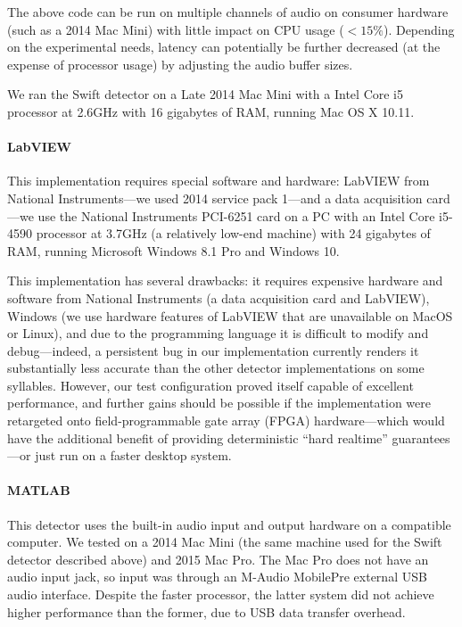 \documentclass[10pt,letterpaper]{article}
\renewcommand{\subsubsection}[1]{\paragraph{#1}}
\begin{document}
The above code can be run on multiple channels of audio on consumer
hardware (such as a 2014 Mac Mini) with little impact on CPU usage
($<15\%$). Depending on the experimental needs, latency can potentially
be further decreased (at the expense of processor usage) by adjusting the audio
buffer sizes.

We ran the Swift detector on a Late 2014 Mac Mini with a Intel Core i5
processor at 2.6GHz  with 16 gigabytes of RAM, running Mac OS X 10.11.

\subsubsection{LabVIEW}

This implementation requires special software and hardware: LabVIEW
from National Instruments---we used 2014 service pack 1---and a data acquisition card---we use the
National Instruments PCI-6251 card on a PC with an Intel Core i5-4590
processor at 3.7GHz (a relatively low-end machine) with 24 gigabytes
of RAM, running Microsoft Windows 8.1 Pro and Windows 10.

This implementation has several drawbacks: it requires expensive hardware and software from National Instruments (a data acquisition card and LabVIEW), Windows (we use hardware features of LabVIEW that are unavailable on MacOS or Linux), and due to the programming language it
is difficult to modify and debug---indeed, a persistent bug in our
implementation currently renders it substantially less accurate than
the other detector implementations on some syllables. However, our
test configuration proved itself capable of excellent performance, and further
gains should be possible if the implementation were retargeted onto
field-programmable gate array (FPGA) hardware---which would have the additional benefit of providing
deterministic ``hard realtime'' guarantees---or just run on a faster
desktop system.

\subsubsection{MATLAB}

This detector uses the built-in audio input and output hardware on a
compatible computer.  We tested on a 2014 Mac Mini (the same machine used
for the Swift detector described above) and 2015 Mac Pro.
The Mac Pro does not have an audio input jack, so input was through an
M-Audio MobilePre external USB audio interface.  Despite the faster
processor, the latter system did not achieve higher performance than
the former, due to USB data transfer overhead.
\end{document}
